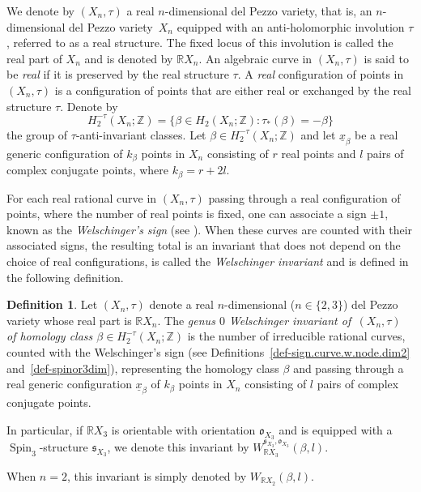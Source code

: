 \documentclass[11pt]{amsart}
\numberwithin{equation}{section}
\theoremstyle{definition}
\newtheorem{definition}{Definition}[section]
\theoremstyle{plain}
\theoremstyle{remark}
\newcommand{\R}{\mathbb{R}}
\newcommand{\Z}{\mathbb{Z}}
\DeclareMathOperator{\Spin}{Spin}
\begin{document}
We denote by $(X_n,\tau)$ a real $n$-dimensional del Pezzo variety, that is, an $n$-dimensional del Pezzo variety~$X_n$ equipped with an anti-holomorphic involution  $\tau$, referred to as a real structure. The fixed locus of this involution is called the real part of $X_n$ and is denoted by $\R X_n$. An algebraic curve in  $(X_n,\tau)$  is said to be  \textit{real} if it is preserved by the real structure $\tau$. A \textit{real} configuration of points in  $(X_n,\tau)$ is a configuration of points that are either real or exchanged by the real structure $\tau$. Denote  by
$$ H_2^{-\tau}(X_n;\Z)=\{\beta \in H_2(X_n;\Z): \tau_*(\beta)=-\beta \}$$
the group of $\tau$-anti-invariant classes.
Let $\beta\in  H_2^{-\tau}(X_n;\Z)$ and let $\underline{x}_\beta$ be a real  generic configuration of $k_\beta$ points in $X_n$ consisting of $r$ real points and $l$ pairs of complex conjugate points, where $k_\beta=r+2l$. 

For each real rational curve in  $(X_n,\tau)$ passing through a real configuration of points, where the number of real points is fixed, one can associate a sign $\pm 1$, known as the \textit{Welschinger's sign} (see \cite{welschinger2005fourfolds,welschinger2005spinor}).  When these curves are counted with their associated signs, the resulting total is an invariant that does not depend on the choice of real configurations, is called the\textit{ Welschinger invariant} and is defined in the following definition. 

\begin{definition} \label{definitionW}
Let $(X_n,\tau)$ denote a real  $n$-dimensional ($n\in \{2,3\}$) del Pezzo variety whose real part is $\R X_n$.
The \emph{genus $0$ Welschinger invariant of\, $(X_n,\tau)$ of homology class $\beta\in H_2^{-\tau}(X_n;\Z)$} is the number of irreducible rational curves, counted with the Welschinger's sign (see Definitions~\ref{def-sign.curve.w.node.dim2} and~\ref{def-spinor3dim}), representing the homology class $\beta$ and passing through a real generic configuration $\underline{x}_\beta$ of $k_\beta$ points in $X_n$ consisting of $l$ pairs of complex conjugate points.

In particular, if $\R X_3$ is orientable with orientation $\mathfrak{o}_{X_3}$ and is equipped with  a $\Spin_3$-structure $\mathfrak{s}_{X_3}$, we denote this invariant by $W_{\R X_3}^{\mathfrak{s}_{X_3}, \mathfrak{o}_{X_3}}(\beta,l)$.

When $n=2$, this invariant is simply denoted by  $W_{\R X_2}(\beta,l)$.
\end{definition}
 
\end{document}
